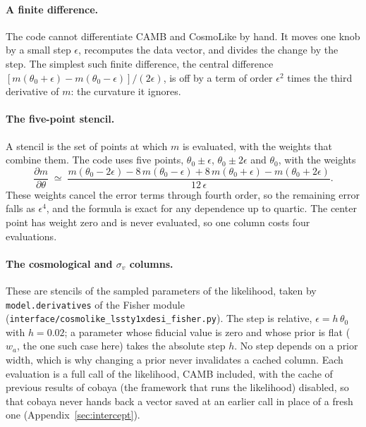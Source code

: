 \documentclass[11pt]{article}
\newcommand{\us}{\_\allowbreak}
\begin{document}
\paragraph{A finite difference.}
The code cannot differentiate CAMB and CosmoLike by hand.  It moves one
knob by a small step $\epsilon$, recomputes the data vector, and divides
the change by the step.  The simplest such finite difference, the
central difference $[m(\theta_0 + \epsilon) - m(\theta_0 - \epsilon)]
/(2\epsilon)$, is off by a term of order $\epsilon^2$ times the third
derivative of $m$: the curvature it ignores.

\paragraph{The five-point stencil.}
A stencil is the set of points at which $m$ is evaluated, with the
weights that combine them.  The code uses five points,
$\theta_0 \pm \epsilon$, $\theta_0 \pm 2\epsilon$ and $\theta_0$, with
the weights
\begin{equation}
  \frac{\partial m}{\partial \theta} \;\simeq\;
  \frac{m(\theta_0 - 2\epsilon) - 8\,m(\theta_0 - \epsilon)
    + 8\,m(\theta_0 + \epsilon) - m(\theta_0 + 2\epsilon)}{12\,\epsilon} .
  \label{eq:stencil}
\end{equation}
These weights cancel the error terms through fourth order, so the
remaining error falls as $\epsilon^4$, and the formula is exact for any
dependence up to quartic.  The center point has weight zero and is
never evaluated, so one column costs four evaluations.

\paragraph{The cosmological and $\sigma_v$ columns.}
These are stencils of the sampled parameters of the likelihood,
taken by \texttt{model.derivatives} of the Fisher module
(\texttt{interface/cosmolike\us lssty1xdesi\us fisher.py}).  The step is
relative, $\epsilon = h\,\theta_0$ with $h = 0.02$; a parameter whose
fiducial value is zero and whose prior is flat ($w_a$, the one such
case here) takes the absolute step $h$.  No step depends on a prior
width, which is why changing a prior never invalidates a cached
column.  Each evaluation is a full call
of the likelihood, CAMB included, with the cache of previous results
of cobaya (the framework that runs the likelihood) disabled, so that
cobaya never hands back a vector saved at an earlier call in place of
a fresh one (Appendix~\ref{sec:intercept}).
\end{document}
